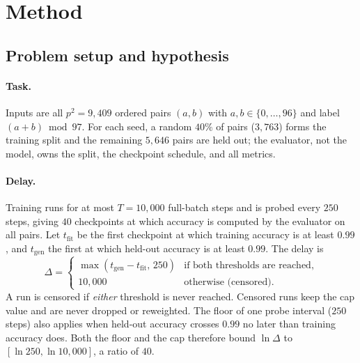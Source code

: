 \documentclass{article}
\begin{document}
\section{Method}
\label{sec:method}

\subsection{Problem setup and hypothesis}
\label{sec:setup}
\paragraph{Task.} Inputs are all $p^2=9{,}409$ ordered pairs $(a,b)$ with $a,b\in\{0,\dots,96\}$ and label $(a+b)\bmod 97$. For each seed, a random $40\%$ of pairs ($3{,}763$) forms the training split and the remaining $5{,}646$ pairs are held out; the evaluator, not the model, owns the split, the checkpoint schedule, and all metrics.

\paragraph{Delay.} Training runs for at most $T=10{,}000$ full-batch steps and is probed every $250$ steps, giving $40$ checkpoints at which accuracy is computed by the evaluator on all pairs. Let $t_{\mathrm{fit}}$ be the first checkpoint at which training accuracy is at least $0.99$, and $t_{\mathrm{gen}}$ the first at which held-out accuracy is at least $0.99$. The delay is
\begin{equation}
\Delta = \begin{cases} \max(t_{\mathrm{gen}}-t_{\mathrm{fit}},\,250) & \text{if both thresholds are reached,}\\ 10{,}000 & \text{otherwise (censored).}\end{cases}
\end{equation}
A run is censored if \emph{either} threshold is never reached. Censored runs keep the cap value and are never dropped or reweighted. The floor of one probe interval ($250$ steps) also applies when held-out accuracy crosses $0.99$ no later than training accuracy does. Both the floor and the cap therefore bound $\ln\Delta$ to $[\ln 250,\ln 10{,}000]$, a ratio of $40$.
\end{document}
